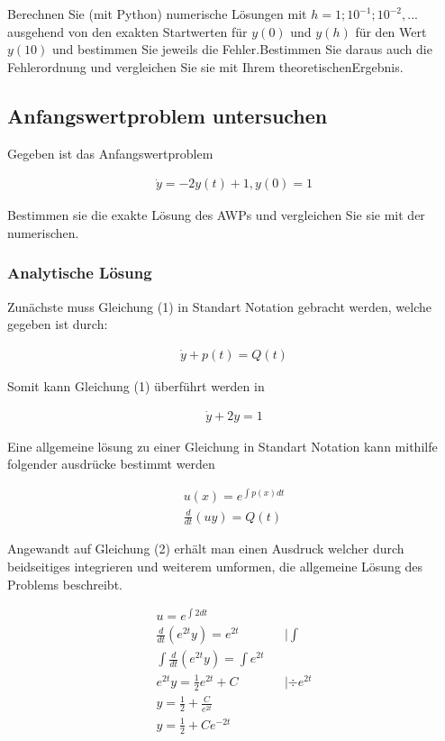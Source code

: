 \documentclass{article}
\begin{document}
		Berechnen Sie (mit Python) numerische Lösungen mit $h = 1; 10^{-1} ; 10^{-2} , ...$ ausgehend von den exakten Startwerten für $y(0)$ und $y(h)$ für den Wert $y(10)$ und bestimmen Sie jeweils die Fehler.Bestimmen Sie daraus auch die Fehlerordnung und vergleichen Sie sie mit Ihrem theoretischenErgebnis.
		
	\subsection{Anfangswertproblem untersuchen}
	
		Gegeben ist das Anfangswertproblem
	
		\begin{align}
			\dot{y} = -2y(t) + 1 , y(0) = 1
		\end{align}
		
		Bestimmen sie die exakte Lösung des AWPs und vergleichen Sie sie mit der numerischen.

		\subsubsection{Analytische Lösung}
		
			Zunächste muss Gleichung (1) in Standart Notation gebracht werden, welche gegeben ist durch:
			
			\begin{align*}
				\dot{y} + p(t) = Q(t)
			\end{align*}
			
			Somit kann Gleichung (1) überführt werden in
			
			\begin{align}
				\dot{y} + 2y = 1
			\end{align}
			
			Eine allgemeine lösung zu einer Gleichung in Standart Notation kann mithilfe folgender ausdrücke bestimmt werden
			
			\begin{align*}
				u(x) = e^{\int p(x) dt} \\
				\frac{d}{dt}(uy) = Q(t)
			\end{align*}
			
			Angewandt auf Gleichung (2) erhält man einen Ausdruck welcher durch beidseitiges integrieren und weiterem umformen, die
			allgemeine Lösung des Problems beschreibt.
			
			\begin{align*}
				u = e^{\int 2 dt}\\
				\frac{d}{dt}(e^{2t}y) = e^{2t} && | \int \\
				\int \frac{d}{dt}(e^{2t}y) = \int e^{2t} \\
				e^{2t}y = \frac{1}{2}e^{2t} + C && | \div e^{2t} \\
				y = \frac{1}{2} + \frac{C}{e^{2t}} \\
				y = \frac{1}{2} + Ce^{-2t}
			\end{align*}
			
\end{document}
